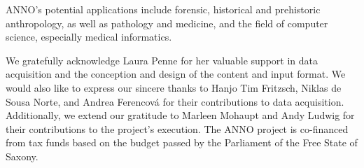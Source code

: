 \documentclass[sw]{iosart2x}
\begin{document}
ANNO's potential applications include forensic, historical and prehistoric anthropology, as well as pathology and medicine, and the field of computer science, especially medical informatics.


\begin{ack}
\noindent\begin{minipage}{0.90\textwidth}
We gratefully acknowledge Laura Penne for her valuable support in data acquisition and the conception and design of the content and input format.
We would also like to express our sincere thanks to Hanjo Tim Fritzsch, Niklas de Sousa Norte, and Andrea Ferencová for their contributions to data acquisition.
Additionally, we extend our gratitude to Marleen Mohaupt and Andy Ludwig for their contributions to the project's execution.
The ANNO project is co-financed from tax funds based on the budget passed by the Parliament of the Free State of Saxony.


\end{minipage}
\end{ack}
\end{document}
